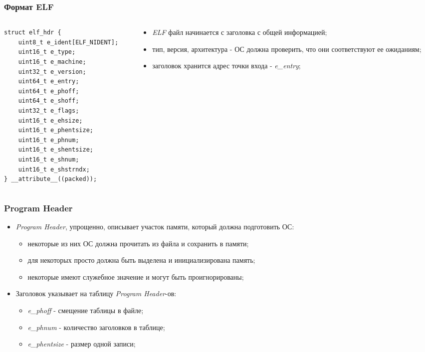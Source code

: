 \begin{frame}[fragile]
\frametitle{Формат ELF}
\begin{columns}[T]
  \begin{column}{.5\linewidth}
    \begin{lstlisting}
struct elf_hdr {
    uint8_t e_ident[ELF_NIDENT];
    uint16_t e_type;
    uint16_t e_machine;
    uint32_t e_version;
    uint64_t e_entry;
    uint64_t e_phoff;
    uint64_t e_shoff;
    uint32_t e_flags;
    uint16_t e_ehsize;
    uint16_t e_phentsize;
    uint16_t e_phnum;
    uint16_t e_shentsize;
    uint16_t e_shnum;
    uint16_t e_shstrndx;
} __attribute__((packed));
    \end{lstlisting}
  \end{column}
  \begin{column}{.6\linewidth}
    \begin{itemize}
      \item \emph{ELF} файл начинается с заголовка с общей информацией;
      \item тип, версия, архитектура - ОС должна проверить, что они соответствуют ее ожиданиям;
      \item заголовок хранится адрес точки входа - \emph{e\_entry};
    \end{itemize}
  \end{column}
\end{columns}
\end{frame}

\begin{frame}
\frametitle{Program Header}
\begin{itemize}
  \item<1-> \emph{Program Header}, упрощенно, описывает участок памяти, который должна подготовить ОС:
    \begin{itemize}
      \item некоторые из них ОС должна прочитать из файла и сохранить в памяти;
      \item для некоторых просто должна быть выделена и инициализирована память;
      \item некоторые имеют служебное значение и могут быть проигнорированы;
    \end{itemize}
  \item<2-> Заголовок указывает на таблицу \emph{Program Header}-ов:
    \begin{itemize}
      \item \emph{e\_phoff} - смещение таблицы в файле;
      \item \emph{e\_phnum} - количество заголовков в таблице;
      \item \emph{e\_phentsize} - размер одной записи;
    \end{itemize}
\end{itemize}
\end{frame}

